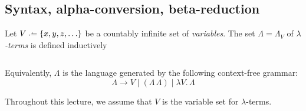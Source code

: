 \subsection{Syntax, alpha-conversion, beta-reduction}
\begin{definition}[Syntax]
  Let $V \defeq \{ x, y, z, \ldots \}$ be a countably infinite set of
  \emph{variables}.  The set $\Lambda = \Lambda_V$ of \emph{$\lambda$-terms} is
  defined inductively
  \begin{columns}
    \begin{prooftree}
    \end{prooftree}
    \begin{prooftree}
    \end{prooftree}
    \begin{prooftree}
    \end{prooftree}
  \end{columns}
  Equivalently, $\Lambda$ is the language generated by the following
  context-free grammar:
  \[
  \Lambda \longrightarrow V \mid (\Lambda\, \Lambda) \mid \lambda V.\, \Lambda
  \]
\end{definition}
Throughout this lecture, we assume that $V$ is the variable set for
$\lambda$-terms. 
